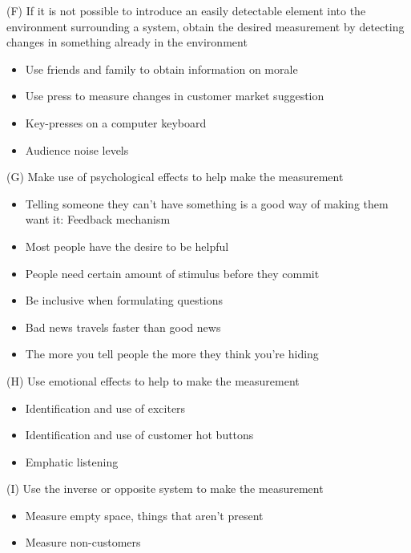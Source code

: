 \documentclass{beamer}
\begin{document}
	\begin{frame}{(F) If it is not possible to introduce an easily detectable element into the environment surrounding a system, obtain the desired measurement by detecting changes in something already in the environment}
		\begin{itemize}
			\item Use friends and family to obtain information on morale
			\item Use press to measure changes in customer market suggestion
			\item Key-presses on a computer keyboard
			\item Audience noise levels
		\end{itemize}
	\end{frame}

	\begin{frame}{(G) Make use of psychological effects to help make the measurement}
		\begin{itemize}
			\item Telling someone they can't have something is a good way of making them want it: Feedback mechanism
			\item Most people have the desire to be helpful
			\item People need certain amount of stimulus before they commit
			\item Be inclusive when formulating questions
			\item Bad news travels faster than good news
			\item The more you tell people the more they think you're hiding
		\end{itemize}
	\end{frame}

	\begin{frame}{(H) Use emotional effects to help to make the measurement}
		\begin{itemize}
			\item Identification and use of exciters
			\item Identification and use of customer hot buttons
			\item Emphatic listening
		\end{itemize}
	\end{frame}

	\begin{frame}{(I) Use the inverse or opposite system to make the measurement}
		\begin{itemize}
			\item Measure empty space, things that aren't present
			\item Measure non-customers
		\end{itemize}
	\end{frame}
\end{document}
